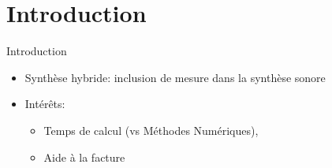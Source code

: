 \section{Introduction}
\begin{frame}{Introduction}

\begin{itemize}
  \item Synthèse hybride: inclusion de mesure dans la synthèse sonore
  \item Intérêts: 
  \begin{itemize}
      \item Temps de calcul (vs Méthodes Numériques),
      \item Aide à la facture
  \end{itemize}
\end{itemize}

\end{frame}
